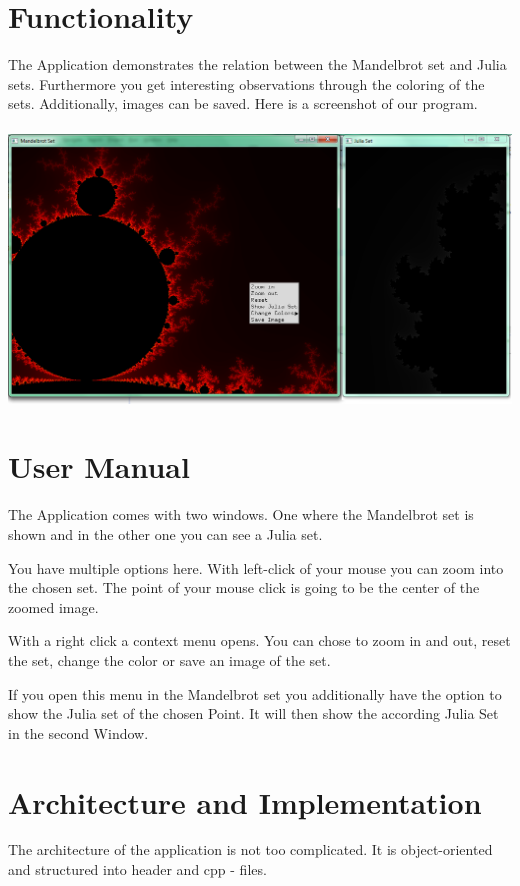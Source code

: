 \documentclass[final, paper=a4, paper=portrait, pagesize=auto, fontsize=10pt,english]{scrartcl}
\begin{document}
\section{Functionality}
The Application demonstrates the relation between the Mandelbrot set and Julia sets. Furthermore you get interesting observations through the coloring of the sets. Additionally, images can be saved.
Here is a screenshot of our program.\\\\
\includegraphics[width=1.0\textwidth]{screenie1}


\section{User Manual}
The Application comes with two windows. One where the Mandelbrot set is shown and in the other one you can see a Julia set. 

You have multiple options here. With left-click of your mouse you can zoom into the chosen set. The point of your mouse click is going to be the center of the zoomed image.

With a right click a context menu opens. You can chose to zoom in and out, reset the set, change the color or save an image of the set. 

If you open this menu in the Mandelbrot set you additionally have the option to show the Julia set of the chosen Point. It will then show the according Julia Set in the second Window.

\section{Architecture and Implementation}
The architecture of the application is not too complicated. It is object-oriented and structured into header and cpp - files.
\end{document}
